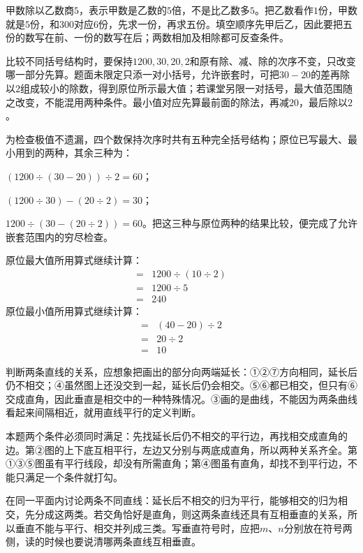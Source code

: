 \documentclass[multi=snippet,border=0pt]{standalone}
\newenvironment{snippet}[3]{\begin{minipage}{#1bp}\color{answerred}\fontsize{#2}{#3}\selectfont\raggedright}{\end{minipage}}
\begin{document}
\begin{snippet}{505}{11.5}{14}甲数除以乙数商\(5\)，表示甲数是乙数的\(5\)倍，不是比乙数多\(5\)。把乙数看作\(1\)份，甲数就是\(5\)份，和\(300\)对应\(6\)份，先求一份，再求五份。填空顺序先甲后乙，因此要把五份的数写在前、一份的数写在后；两数相加及相除都可反查条件。\end{snippet}
\begin{snippet}{505}{11.5}{14}比较不同括号结构时，要保持\(1200,30,20,2\)和原有除、减、除的次序不变，只改变哪一部分先算。题面未限定只添一对小括号，允许嵌套时，可把\(30-20\)的差再除以\(2\)组成较小的除数，得到原位所示最大值；若课堂另限一对括号，最大值范围随之改变，不能混用两种条件。最小值对应先算最前面的除法，再减\(20\)，最后除以\(2\)。\par 为检查极值不遗漏，四个数保持次序时共有五种完全括号结构；原位已写最大、最小用到的两种，其余三种为：\par \((1200\div(30-20))\div2=60\)；\par \((1200\div30)-(20\div2)=30\)；\par \(1200\div(30-(20\div2))=60\)。把这三种与原位两种的结果比较，便完成了允许嵌套范围内的穷尽检查。\par 原位最大值所用算式继续计算：\[\begin{aligned}={}&1200\div(10\div2)\\={}&1200\div5\\={}&240\end{aligned}\]原位最小值所用算式继续计算：\[\begin{aligned}={}&(40-20)\div2\\={}&20\div2\\={}&10\end{aligned}\]\end{snippet}
\begin{snippet}{505}{11.5}{14}判断两条直线的关系，应想象把画出的部分向两端延长：①②⑦方向相同，延长后仍不相交；④虽然图上还没交到一起，延长后仍会相交。⑤⑥都已相交，但只有⑥交成直角，因此垂直是相交中的一种特殊情况。③画的是曲线，不能因为两条曲线看起来间隔相近，就用直线平行的定义判断。\end{snippet}
\begin{snippet}{505}{11.5}{14}本题两个条件必须同时满足：先找延长后仍不相交的平行边，再找相交成直角的边。第②图的上下底互相平行，左边又分别与两底成直角，所以两种关系齐全。第①③⑤图虽有平行线段，却没有所需直角；第④图虽有直角，却找不到平行边，不能只满足一个条件就打勾。\end{snippet}
\begin{snippet}{505}{11.5}{14}在同一平面内讨论两条不同直线：延长后不相交的归为平行，能够相交的归为相交，先分成这两类。若交角恰好是直角，则这两条直线还具有互相垂直的关系，所以垂直不能与平行、相交并列成三类。写垂直符号时，应把\(m\)、\(n\)分别放在符号两侧，读的时候也要说清哪两条直线互相垂直。\end{snippet}
\end{document}
